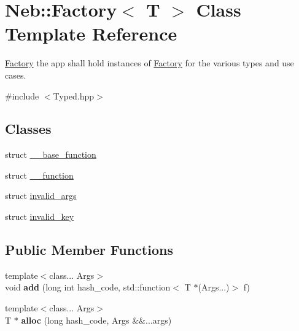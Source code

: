 \hypertarget{classNeb_1_1Factory}{\section{\-Neb\-:\-:\-Factory$<$ \-T $>$ \-Class \-Template \-Reference}
\label{classNeb_1_1Factory}
}


\hyperlink{classNeb_1_1Factory}{\-Factory} the app shall hold instances of \hyperlink{classNeb_1_1Factory}{\-Factory} for the various types and use cases.  




{\ttfamily \#include $<$\-Typed.\-hpp$>$}

\subsection*{\-Classes}
\begin{DoxyCompactItemize}
\item 
struct \hyperlink{structNeb_1_1Factory_1_1____base__function}{\-\_\-\-\_\-base\-\_\-function}
\item 
struct \hyperlink{structNeb_1_1Factory_1_1____function}{\-\_\-\-\_\-function}
\item 
struct \hyperlink{structNeb_1_1Factory_1_1invalid__args}{invalid\-\_\-args}
\item 
struct \hyperlink{structNeb_1_1Factory_1_1invalid__key}{invalid\-\_\-key}
\end{DoxyCompactItemize}
\subsection*{\-Public \-Member \-Functions}
\begin{DoxyCompactItemize}
\item 
\hypertarget{classNeb_1_1Factory_af8dac02d0e0327fcbe54bcb9aa419b59}{{\footnotesize template$<$class... \-Args$>$ }\\void {\bfseries add} (long int hash\-\_\-code, std\-::function$<$ \-T $\ast$(\-Args...)$>$ f)}\label{classNeb_1_1Factory_af8dac02d0e0327fcbe54bcb9aa419b59}

\item 
\hypertarget{classNeb_1_1Factory_ac499b39e795c35e0894811b2706d5c74}{{\footnotesize template$<$class... \-Args$>$ }\\\-T $\ast$ {\bfseries alloc} (long hash\-\_\-code, \-Args \&\&...args)}\label{classNeb_1_1Factory_ac499b39e795c35e0894811b2706d5c74}

\end{DoxyCompactItemize}

